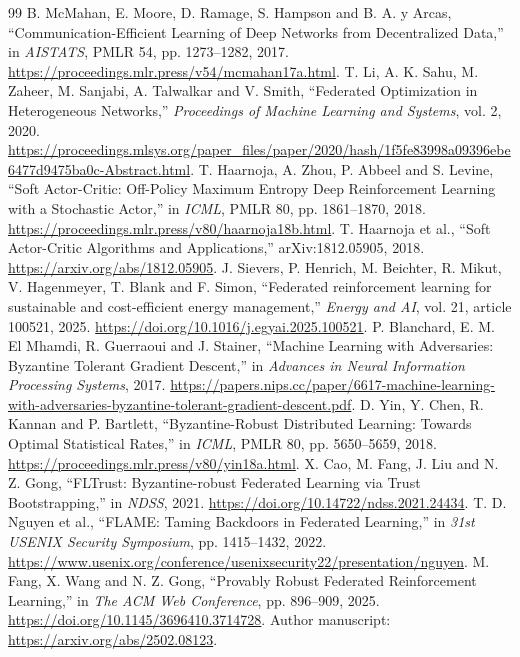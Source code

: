 \documentclass[preprint,12pt,a4paper]{elsarticle}
\begin{document}
\begin{thebibliography}{99}
 B. McMahan, E. Moore, D. Ramage, S. Hampson and B. A. y Arcas, ``Communication-Efficient Learning of Deep Networks from Decentralized Data,'' in \emph{AISTATS}, PMLR 54, pp. 1273--1282, 2017. \url{https://proceedings.mlr.press/v54/mcmahan17a.html}.
 T. Li, A. K. Sahu, M. Zaheer, M. Sanjabi, A. Talwalkar and V. Smith, ``Federated Optimization in Heterogeneous Networks,'' \emph{Proceedings of Machine Learning and Systems}, vol. 2, 2020. \url{https://proceedings.mlsys.org/paper_files/paper/2020/hash/1f5fe83998a09396ebe6477d9475ba0c-Abstract.html}.
 T. Haarnoja, A. Zhou, P. Abbeel and S. Levine, ``Soft Actor-Critic: Off-Policy Maximum Entropy Deep Reinforcement Learning with a Stochastic Actor,'' in \emph{ICML}, PMLR 80, pp. 1861--1870, 2018. \url{https://proceedings.mlr.press/v80/haarnoja18b.html}.
 T. Haarnoja et al., ``Soft Actor-Critic Algorithms and Applications,'' arXiv:1812.05905, 2018. \url{https://arxiv.org/abs/1812.05905}.
 J. Sievers, P. Henrich, M. Beichter, R. Mikut, V. Hagenmeyer, T. Blank and F. Simon, ``Federated reinforcement learning for sustainable and cost-efficient energy management,'' \emph{Energy and AI}, vol. 21, article 100521, 2025. \url{https://doi.org/10.1016/j.egyai.2025.100521}.
 P. Blanchard, E. M. El Mhamdi, R. Guerraoui and J. Stainer, ``Machine Learning with Adversaries: Byzantine Tolerant Gradient Descent,'' in \emph{Advances in Neural Information Processing Systems}, 2017. \url{https://papers.nips.cc/paper/6617-machine-learning-with-adversaries-byzantine-tolerant-gradient-descent.pdf}.
 D. Yin, Y. Chen, R. Kannan and P. Bartlett, ``Byzantine-Robust Distributed Learning: Towards Optimal Statistical Rates,'' in \emph{ICML}, PMLR 80, pp. 5650--5659, 2018. \url{https://proceedings.mlr.press/v80/yin18a.html}.
 X. Cao, M. Fang, J. Liu and N. Z. Gong, ``FLTrust: Byzantine-robust Federated Learning via Trust Bootstrapping,'' in \emph{NDSS}, 2021. \url{https://doi.org/10.14722/ndss.2021.24434}.
 T. D. Nguyen et al., ``FLAME: Taming Backdoors in Federated Learning,'' in \emph{31st USENIX Security Symposium}, pp. 1415--1432, 2022. \url{https://www.usenix.org/conference/usenixsecurity22/presentation/nguyen}.
 M. Fang, X. Wang and N. Z. Gong, ``Provably Robust Federated Reinforcement Learning,'' in \emph{The ACM Web Conference}, pp. 896--909, 2025. \url{https://doi.org/10.1145/3696410.3714728}. Author manuscript: \url{https://arxiv.org/abs/2502.08123}.

\end{thebibliography}
\end{document}

